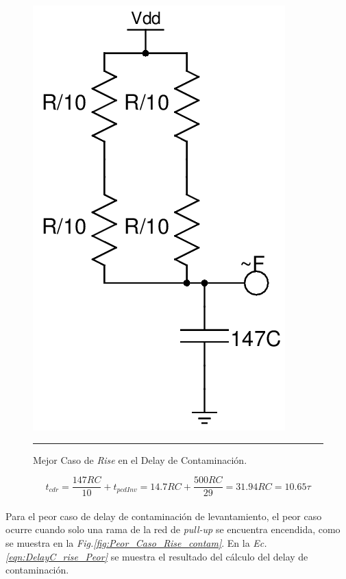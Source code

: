 \documentclass[12pt,a4paper]{article} %
\begin{document}
\begin{figure}[htbp]
  \centering
    \includegraphics[scale=0.3]{./Mejor_Caso_Rise_contam.png}
    \rule{35em}{0.3pt}
  \caption[C_Carga]{Mejor Caso de \textit{Rise} en el Delay de Contaminación.}
  \label{fig:Mejor_Caso_Rise_contam}
\end{figure}

\begin{equation}\label{eqn:DelayC_rise_Mejor}
t_{cdr} = \frac{147RC}{10}+t_{pcdInv}=14.7RC+\frac{500RC}{29}=31.94RC=10.65\tau
\end{equation}\\

Para el peor caso de delay de contaminación de levantamiento, el peor caso ocurre cuando solo una rama de la red de \textit{pull-up} se encuentra encendida, como se muestra en la \textit{Fig.\ref{fig:Peor_Caso_Rise_contam}}. En la \textit{Ec.\ref{eqn:DelayC_rise_Peor}} se muestra el resultado del cálculo del delay de contaminación.\\
\end{document}
